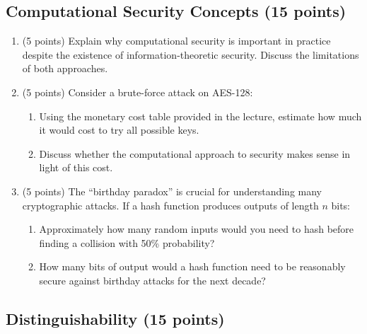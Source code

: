 \documentclass[10pt,a4paper,american]{exam}
\begin{document}
\subsection{Computational Security Concepts (15 points)}

\begin{enumerate}
	\item (5 points) Explain why computational security is important in practice despite the existence of information-theoretic security. Discuss the limitations of both approaches.

	\item (5 points) Consider a brute-force attack on AES-128:
	      \begin{enumerate}
		      \item Using the monetary cost table provided in the lecture, estimate how much it would cost to try all possible keys.
		      \item Discuss whether the computational approach to security makes sense in light of this cost.
	      \end{enumerate}

	\item (5 points) The ``birthday paradox'' is crucial for understanding many cryptographic attacks. If a hash function produces outputs of length $n$ bits:
	      \begin{enumerate}
		      \item Approximately how many random inputs would you need to hash before finding a collision with 50\% probability?
		      \item How many bits of output would a hash function need to be reasonably secure against birthday attacks for the next decade?
	      \end{enumerate}
\end{enumerate}

\subsection{Distinguishability (15 points)}
\end{document}
